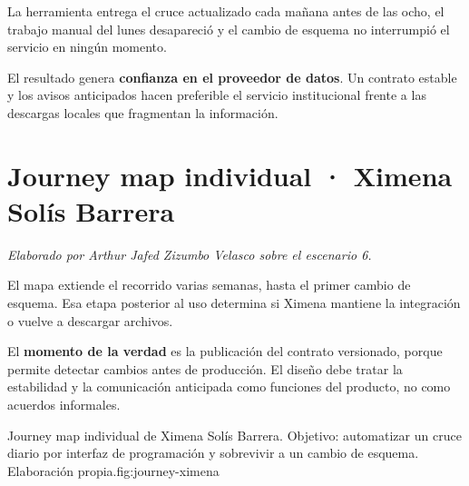 
La herramienta entrega el cruce actualizado cada mañana antes de las ocho, el trabajo manual
del lunes desapareció y el cambio de esquema no interrumpió el servicio en ningún momento.

El resultado genera \textbf{confianza en el proveedor de datos}. Un contrato estable y los
avisos anticipados hacen preferible el servicio institucional frente a las descargas locales
que fragmentan la información.


\begin{uxlist}
\end{uxlist}

\clearpage
\section{Journey map individual · Ximena Solís Barrera}

\textit{Elaborado por Arthur Jafed Zizumbo Velasco sobre el escenario 6.}

El mapa extiende el recorrido varias semanas, hasta el primer cambio de esquema. Esa etapa
posterior al uso determina si Ximena mantiene la integración o vuelve a descargar archivos.

El \textbf{momento de la verdad} es la publicación del contrato versionado, porque permite
detectar cambios antes de producción. El diseño debe tratar la estabilidad y la comunicación
anticipada como funciones del producto, no como acuerdos informales.

  {Journey map individual de Ximena Solís Barrera. Objetivo: automatizar un cruce diario por
   interfaz de programación y sobrevivir a un cambio de esquema. Elaboración
   propia.}{fig:journey-ximena}

